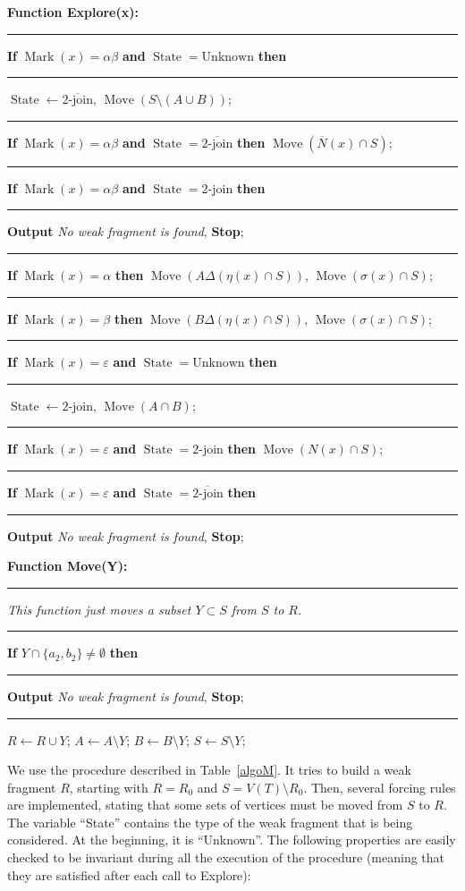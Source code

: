 \documentclass[11 pt] {article}
\DeclareMathOperator{\Mark}{Mark}
\DeclareMathOperator{\Move}{Move}
\DeclareMathOperator{\State}{State}
\begin{document}
\begin{table}
{\begin{description}
\item{\bf Function Explore(x):}


\rule{1em}{0ex}\textbf{If} 
$\Mark(x)=\alpha\beta$ \textbf{and} $\State=\text{Unknown}$ \textbf{then}

\rule{2em}{0ex}$\State\leftarrow \overline{\text{$2$-join}}$, $\Move(S
\setminus (A
\cup B))$;

\rule{1em}{0ex}\textbf{If} $\Mark(x)=\alpha\beta$ \textbf{and}
$\State=\overline{\text{$2$-join}}$ \textbf{then}  
$\Move( \overline{N}(x)\cap S)$;

\rule{1em}{0ex}\textbf{If} $\Mark(x)=\alpha\beta$ \textbf{and}
$\State=\text{$2$-join}$ \textbf{then}\\
\rule{2em}{0ex}{\textbf{Output} {\it No weak fragment is found}}, 
\textbf{Stop};


\rule{1em}{0ex}\textbf{If} $\Mark(x)=\alpha$ \textbf{then}  
$\Move(A \Delta (\eta(x)\cap S))$, $\Move(\sigma(x)\cap S)$;

\rule{1em}{0ex}\textbf{If} $\Mark(x)=\beta$ \textbf{then}  
$\Move(B \Delta (\eta(x)\cap S))$, $\Move(\sigma(x)\cap S)$;

\rule{1em}{0ex}\textbf{If} $\Mark(x)=\varepsilon$ \textbf{and}
$\State=\text{Unknown}$ \textbf{then} 

\rule{2em}{0ex}$\State\leftarrow \text{$2$-join}$, $\Move(A\cap B)$;

\rule{1em}{0ex}\textbf{If} $\Mark(x)=\varepsilon$ \textbf{and} $\State=\text{$2$-join}$ \textbf{then} 
$\Move(N(x)\cap S)$;

\rule{1em}{0ex}\textbf{If} $\Mark(x)=\varepsilon$ \textbf{and} $\State=\overline{\text{$2$-join}}$ \textbf{then} \\
\rule{2em}{0ex}{\textbf{Output} {\it No weak fragment is found}}, 
\textbf{Stop};

\item{\bf Function Move(Y):}

\rule{1em}{0ex}{\it This function just moves a subset $Y \subset S$ from $S$ to $R$. }

\rule{1em}{0ex}\textbf{If} $Y\cap \{a_2,b_2\}\not=\emptyset$ \textbf{then} \\
\rule{2em}{0ex}{\textbf{Output} {\it No weak fragment is found}}, 
\textbf{Stop};

\rule{1em}{0ex}{$R \leftarrow R \cup Y$;  $ A\leftarrow A \setminus Y$;   $ B\leftarrow B \setminus Y$;  $ S\leftarrow S \setminus Y$;}
\end{description}

\caption{Procedure used in Theorem~\ref{l:forcing}\label{algoM}}}
\end{table}
We use the procedure described in Table~\ref{algoM}.  It
tries to build a weak fragment $R$, starting with $R = R_0$ and $S=V(T)\setminus R_0$.  Then,
several forcing rules are implemented, stating that some sets of
vertices must be moved from $S$ to $R$.  The variable ``State''
contains the type of the weak fragment that is being considered.  At the
beginning, it is ``Unknown''.   The following
properties are easily checked to be invariant during all the
execution of the procedure (meaning that they are satisfied after each
call to Explore):
\end{document}
